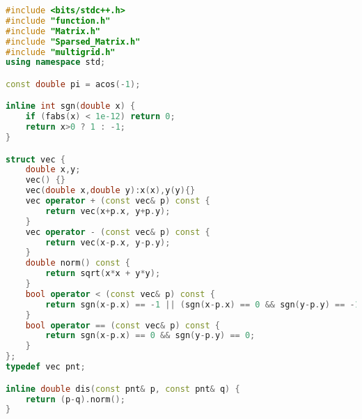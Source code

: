 \documentclass{ctexart}
\begin{document}
\begin{lstlisting}[language=c++]
#include <bits/stdc++.h>
#include "function.h"
#include "Matrix.h"
#include "Sparsed_Matrix.h"
#include "multigrid.h"
using namespace std;

const double pi = acos(-1);

inline int sgn(double x) {
	if (fabs(x) < 1e-12) return 0;
	return x>0 ? 1 : -1;
}

struct vec {
	double x,y;
	vec() {}
	vec(double x,double y):x(x),y(y){}
	vec operator + (const vec& p) const {
		return vec(x+p.x, y+p.y);
	}
	vec operator - (const vec& p) const {
		return vec(x-p.x, y-p.y);
	}
	double norm() const {
		return sqrt(x*x + y*y);
	}
	bool operator < (const vec& p) const {
		return sgn(x-p.x) == -1 || (sgn(x-p.x) == 0 && sgn(y-p.y) == -1);
	}
	bool operator == (const vec& p) const {
		return sgn(x-p.x) == 0 && sgn(y-p.y) == 0;
	}
};
typedef vec pnt;

inline double dis(const pnt& p, const pnt& q) {
	return (p-q).norm();
}


\end{lstlisting}
\end{document}
